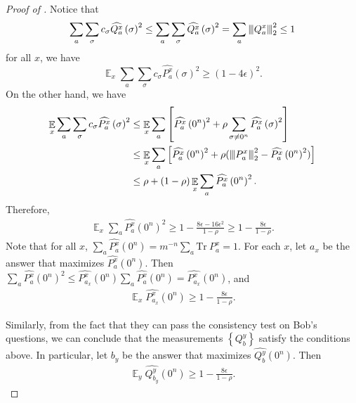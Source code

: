 \documentclass[11pt]{article}
\theoremstyle{plain}
\theoremstyle{definition}
\newcommand {\set} [1] {\ensuremath{ \left\lbrace #1 \right\rbrace }}
\newcommand {\br} [1] {\ensuremath{ \left( #1 \right) }}
\DeclareMathOperator*{\bigE}{\mathbb{E}}
\newcommand{\nnorm}[1]{{\left\vert\kern-0.25ex\left\vert\kern-0.25ex\left\vert #1
		\right\vert\kern-0.25ex\right\vert\kern-0.25ex\right\vert}}
\newcommand {\Tr} {\ensuremath{ \mathrm{Tr} }}
\newcommand{\1}{\mathbb{1}} %
\begin{document}
\begin{proof}[Proof of ]
Notice that $$\sum_a \sum_\sigma c_{\sigma} \widehat{Q^x_a}\br{\sigma}^2\leq\sum_a \sum_\sigma\widehat{Q^x_a}\br{\sigma}^2=\sum_a\nnorm{Q^x_a}^2_2\leq1$$ for all $x$, we have
\[\bigE_x \sum_a \sum_\sigma c_{\sigma} \widehat{P^x_a}\br{\sigma}^2\geq(1-4\epsilon)^2.\]
On the other hand, we have
\begin{align*}
    \bigE_x \sum_a \sum_\sigma c_{\sigma} \widehat{P^x_a}\br{\sigma}^2
    &\leq \bigE_x \sum_a 
    \left[\widehat{P^x_a}\br{0^n}^2 + \rho  \sum_{\sigma \neq 0^n} \widehat{P^x_a}\br{\sigma}^2\right] \\
    &\leq \bigE_x \sum_a
    \left[\widehat{P^x_a}\br{0^n}^2 + \rho(\nnorm{P^x_a}_2^2 - \widehat{P^x_a}\br{0^n}^2) \right] \\
    &\leq \rho + (1-\rho) \bigE_x \sum_a \widehat{P^x_a}\br{0^n}^2.
\end{align*}
Therefore,
\begin{align}
    \bigE_x \sum_a \widehat{P^x_a}\br{0^n}^2 \geq 1 - \frac{8\epsilon -16\epsilon^2}{1-\rho}\geq1-\frac{8\epsilon}{1-\rho}.
\end{align}
Note that for all $x$, $\sum_a \widehat{P^x_a}\br{0^n} =m^{-n}\sum_a\Tr~P^x_a=1$.
For each $x$, let $a_x$ be the answer that maximizes $\widehat{P^x_a}\br{0^n}$.
Then $\sum_a \widehat{P^x_a}\br{0^n}^2 \leq \widehat{P^x_{a_x}}\br{0^n}\sum_a \widehat{P^x_a}\br{0^n} = \widehat{P^x_{a_x}}\br{0^n}$, and
\begin{align*}
  \bigE_x \widehat{P^x_{a_x}}\br{0^n} \geq 1 - \frac{8\epsilon }{1-\rho}.
\end{align*}

Similarly, from the fact that they can pass the consistency test on Bob's questions, we can conclude that the measurements $\set{ Q^y_b }$ satisfy the conditions above.
In particular, let $b_y$ be the answer that maximizes $\widehat{Q^y_b}\br{0^n}$. Then
\begin{align*}
    \bigE_{y} \widehat{Q^y_{b_y}}\br{0^n} \geq 1 - \frac{8\epsilon}{1-\rho}.
\end{align*}


\end{proof}
\end{document}
